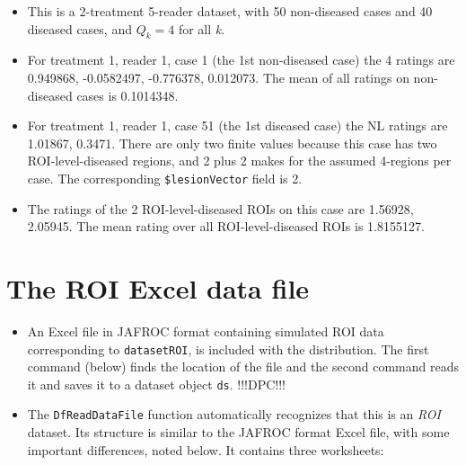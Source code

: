 \documentclass[
]{book}
\newenvironment{Shaded}{\begin{snugshade}}{\end{snugshade}}
\newcommand{\CommentTok}[1]{\textcolor[rgb]{0.56,0.35,0.01}{\textit{#1}}}
\providecommand{\tightlist}{%
  \setlength{\itemsep}{0pt}\setlength{\parskip}{0pt}}
\begin{document}
\begin{itemize}
\tightlist
\item
  This is a 2-treatment 5-reader dataset, with 50 non-diseased cases and 40 diseased cases, and \({Q_k}=4\) for all \emph{k}.\\
\item
  For treatment 1, reader 1, case 1 (the 1st non-diseased case) the 4 ratings are 0.949868, -0.0582497, -0.776378, 0.012073. The mean of all ratings on non-diseased cases is 0.1014348.\\
\item
  For treatment 1, reader 1, case 51 (the 1st diseased case) the NL ratings are 1.01867, 0.3471. There are only two finite values because this case has two ROI-level-diseased regions, and 2 plus 2 makes for the assumed 4-regions per case. The corresponding \texttt{\$lesionVector} field is 2.\\
\item
  The ratings of the 2 ROI-level-diseased ROIs on this case are 1.56928, 2.05945. The mean rating over all ROI-level-diseased ROIs is 1.8155127.
\end{itemize}

\hypertarget{the-roi-excel-data-file}{%
\section{The ROI Excel data file}\label{the-roi-excel-data-file}}

\begin{itemize}
\tightlist
\item
  An Excel file in JAFROC format containing simulated ROI data corresponding to \texttt{datasetROI}, is included with the distribution. The first command (below) finds the location of the file and the second command reads it and saves it to a dataset object \texttt{ds}. !!!DPC!!!
\item
  The \texttt{DfReadDataFile} function automatically recognizes that this is an \emph{ROI} dataset. Its structure is similar to the JAFROC format Excel file, with some important differences, noted below. It contains three worksheets:
\end{itemize}

\begin{Shaded}
\end{Shaded}
\end{document}
